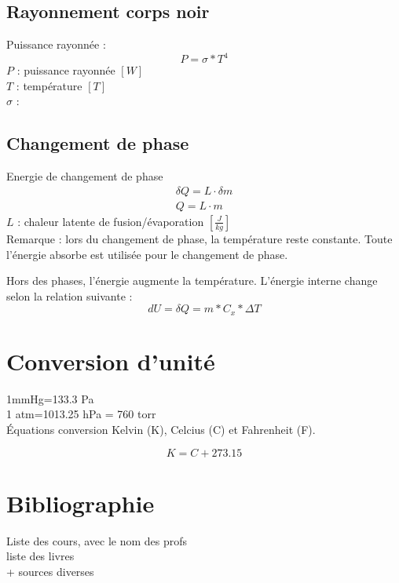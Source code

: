 	\subsection{Rayonnement corps noir}
	Puissance rayonnée :
	\begin{equation}
	P= \sigma * T^4
	\end{equation}
	$P$ : puissance rayonnée $[W]$\\
	$T$ : température $[T]$\\
	$\sigma$ : 
	
	\subsection{Changement de phase}
	Energie de changement de phase
	\begin{eqnarray}
	\delta Q=L \cdot \delta m\\
	Q=L \cdot m
	\end{eqnarray}
	$L$ : chaleur latente de fusion/évaporation $[\frac{J}{kg}]$\\
	Remarque : lors du changement de phase, la température reste constante. Toute l'énergie absorbe est utilisée pour le changement de phase.
	
	Hors des phases, l'énergie augmente la température. L'énergie interne change selon la relation suivante : 
	\begin{equation}
	dU=\delta Q=m*C_x*\Delta T
	\end{equation}
	
	
	
	
	\newpage
	\section{Conversion d'unité}
	
	1mmHg=133.3 Pa\\
	1 atm=1013.25 hPa = 760 torr\\
	
	Équations conversion Kelvin (K), Celcius (C) et Fahrenheit (F).
	
	\begin{equation}
	K=C+273.15
	\end{equation}
	
	
	\newpage
	\section{Bibliographie}
	Liste des cours, avec le nom des profs\\
	liste des livres\\
	+ sources diverses


